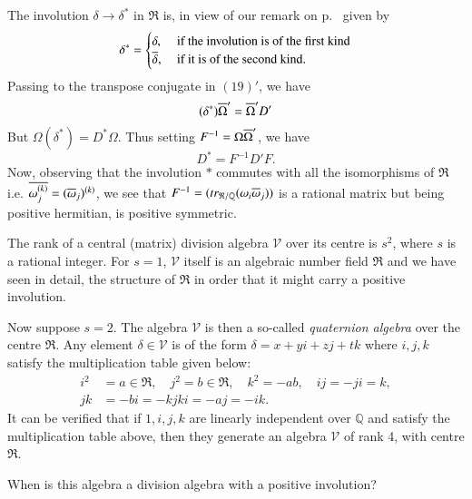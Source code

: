 \begin{remark*}
The involution $\delta \rightarrow \delta^{\ast}$ in $\mathfrak{R}$
is, in view of our remark on p.~\pageref{rem:p22} given by 
\begin{equation*}
\delta^{\ast} = 
\begin{cases}
\delta, & \text{ if the involution is of the first kind}\\
\overline{\delta}, &  \text{ if it is of the second kind.}
\end{cases}
\end{equation*}
Passing to the transpose conjugate in $(19)'$, we have
$$
(\delta^{\ast}) \overline{\Omega}' = \overline{\Omega}'D'
$$\pageoriginale
But $\Omega (\delta^{\ast}) = D^{\ast}\Omega$. Thus setting $F^{-1} =
\Omega \overline{\Omega}'$, we have 
$$
D^{\ast} = F^{-1} D' F.
$$\label{p25}
Now, observing that the involution $\ast$ commutes with all the
isomorphisms of $\mathfrak{R}$ i.e. $\overline{\omega^{(k)}_j} =
(\overline{\omega}_j)^{(k)}$, we see that $F^{-1}=
(tr_{\mathfrak{R}/\mathbb{Q}}(\omega_i \overline{\omega}_j))$ is a rational
matrix but being positive hermitian, is positive symmetric.

The rank of a central (matrix) division algebra $\mathscr{V}$ over its  
centre is $s^2$, where $s$ is a rational integer. For $s=1$,
$\mathscr{V}$ itself is an algebraic number field $\mathfrak{R}$ and
we have seen in detail, the structure of $\mathfrak{R}$ in order that
it might carry a positive involution.

Now suppose $s=2$. The algebra $\mathscr{V}$ is then a so-called {\em
  quaternion algebra} over the centre $\mathfrak{R}$. Any element
$\delta \in \mathscr{V}$ is of the form $\delta = x + y i + z j + tk$
where $i,j,k$ satisfy the multiplication table given below:
\begin{align*}
i^2 & = a \in \mathfrak{R}, \quad j^2 = b \in \mathfrak{R}, \quad k^2
= -ab, \quad ij = -ji = k,\\  jk &= -bi = - kj
ki  = -aj = - ik.
\end{align*}
It can be verified that if $1,i,j,k$ are linearly independent over
$\mathbb{Q}$ and satisfy the multiplication table above, then they
generate an algebra $\mathscr{V}$ of rank 4, with centre
$\mathfrak{R}$.

When is this algebra a division algebra with a positive involution?
 

\end{remark*}
